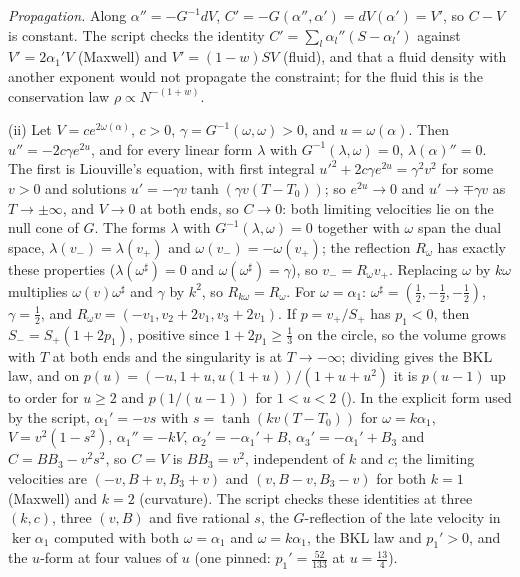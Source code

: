 \emph{Propagation.} Along $\alpha'' = -G^{-1}dV$, $C' = -G(\alpha'', \alpha') = dV(\alpha') = V'$, so $C - V$ is constant. The script checks the identity $C' = \sum_{l}\alpha_{l}''(S - \alpha_{l}')$ against $V' = 2\alpha_{1}'V$ (Maxwell) and $V' = (1 - w)SV$ (fluid), and that a fluid density with another exponent would not propagate the constraint; for the fluid this is the conservation law $\rho \propto N^{-(1 + w)}$.

(ii) Let $V = ce^{2\omega(\alpha)}$, $c > 0$, $\gamma = G^{-1}(\omega, \omega) > 0$, and $u = \omega(\alpha)$. Then $u'' = -2c\gamma e^{2u}$, and for every linear form $\lambda$ with $G^{-1}(\lambda, \omega) = 0$, $\lambda(\alpha)'' = 0$. The first is Liouville's equation, with first integral $u'^{2} + 2c\gamma e^{2u} = \gamma^{2}v^{2}$ for some $v > 0$ and solutions $u' = -\gamma v\tanh(\gamma v(T - T_{0}))$; so $e^{2u} \to 0$ and $u' \to \mp\gamma v$ as $T \to \pm\infty$, and $V \to 0$ at both ends, so $C \to 0$: both limiting velocities lie on the null cone of $G$. The forms $\lambda$ with $G^{-1}(\lambda, \omega) = 0$ together with $\omega$ span the dual space, $\lambda(v_{-}) = \lambda(v_{+})$ and $\omega(v_{-}) = -\omega(v_{+})$; the reflection $R_{\omega}$ has exactly these properties ($\lambda(\omega^{\sharp}) = 0$ and $\omega(\omega^{\sharp}) = \gamma$), so $v_{-} = R_{\omega}v_{+}$. Replacing $\omega$ by $k\omega$ multiplies $\omega(v)\omega^{\sharp}$ and $\gamma$ by $k^{2}$, so $R_{k\omega} = R_{\omega}$. For $\omega = \alpha_{1}$: $\omega^{\sharp} = (\tfrac12, -\tfrac12, -\tfrac12)$, $\gamma = \tfrac12$, and $R_{\omega}v = (-v_{1}, v_{2} + 2v_{1}, v_{3} + 2v_{1})$. If $p = v_{+}/S_{+}$ has $p_{1} < 0$, then $S_{-} = S_{+}(1 + 2p_{1})$, positive since $1 + 2p_{1} \ge \tfrac13$ on the circle, so the volume grows with $T$ at both ends and the singularity is at $T \to -\infty$; dividing gives the BKL law, and on $p(u) = (-u, 1 + u, u(1 + u))/(1 + u + u^{2})$ it is $p(u - 1)$ up to order for $u \ge 2$ and $p(1/(u - 1))$ for $1 < u < 2$ (). In the explicit form used by the script, $\alpha_{1}' = -vs$ with $s = \tanh(kv(T - T_{0}))$ for $\omega = k\alpha_{1}$, $V = v^{2}(1 - s^{2})$, $\alpha_{1}'' = -kV$, $\alpha_{2}' = -\alpha_{1}' + B$, $\alpha_{3}' = -\alpha_{1}' + B_{3}$ and $C = BB_{3} - v^{2}s^{2}$, so $C = V$ is $BB_{3} = v^{2}$, independent of $k$ and $c$; the limiting velocities are $(-v, B + v, B_{3} + v)$ and $(v, B - v, B_{3} - v)$ for both $k = 1$ (Maxwell) and $k = 2$ (curvature). The script checks these identities at three $(k, c)$, three $(v, B)$ and five rational $s$, the $G$-reflection of the late velocity in $\ker\alpha_{1}$ computed with both $\omega = \alpha_{1}$ and $\omega = k\alpha_{1}$, the BKL law and $p_{1}' > 0$, and the $u$-form at four values of $u$ (one pinned: $p_{1}' = \tfrac{52}{133}$ at $u = \tfrac{13}{4}$).

